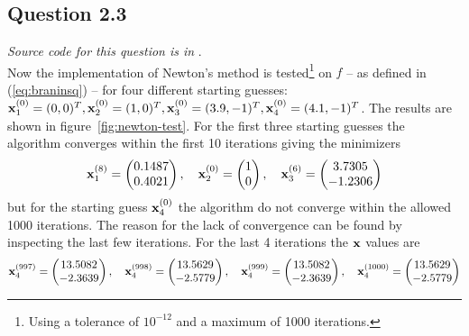 \subsection*{Question 2.3}
\textit{Source code for this question is in }. \\
Now the implementation of Newton's method is tested\footnote{Using a tolerance of $10^{-12}$ and a maximum of 1000 iterations.} on $f$ -- as defined in (\ref{eq:braninsq}) -- for four different starting guesses: $\mathbf{x}^{(0)}_{1}=(0,0)^T, \mathbf{x}^{(0)}_{2}=(1,0)^T, \mathbf{x}^{(0)}_{3}=(3.9, -1)^T, \mathbf{x}^{(0)}_{4}=(4.1, -1)^T$. The results are shown in figure~\ref{fig:newton-test}. For the first three starting guesses the algorithm converges within the first 10 iterations giving the minimizers
\begin{equation*}
    \mathbf{x}_1^{(8)} = \begin{pmatrix}
        0.1487 \\ 0.4021
    \end{pmatrix}, \quad
    \mathbf{x}_2^{(0)} = \begin{pmatrix}
        1 \\ 0
    \end{pmatrix}, \quad
    \mathbf{x}_3^{(6)} = \begin{pmatrix}
        3.7305 \\ -1.2306
    \end{pmatrix}
\end{equation*}
but for the starting guess $\mathbf{x}_4^{(0)}$ the algorithm do not converge within the allowed 1000 iterations. The reason for the lack of convergence can be found by inspecting the last few iterations. For the last 4 iterations the $\mathbf{x}$ values are
\begin{equation*}
    \mathbf{x}_4^{(997)} = \begin{pmatrix}
        13.5082 \\ -2.3639
    \end{pmatrix}, \quad 
    \mathbf{x}_4^{(998)} = \begin{pmatrix}
        13.5629 \\ -2.5779
    \end{pmatrix}, \quad 
    \mathbf{x}_4^{(999)} = \begin{pmatrix}
        13.5082 \\ -2.3639
    \end{pmatrix}, \quad 
    \mathbf{x}_4^{(1000)} = \begin{pmatrix}
        13.5629 \\ -2.5779
    \end{pmatrix}
\end{equation*}
